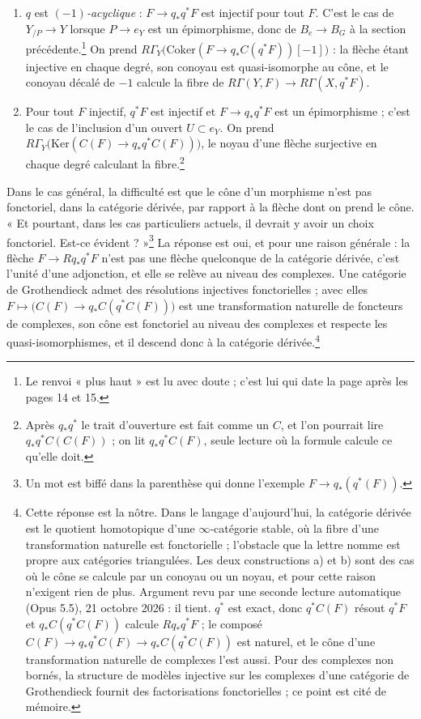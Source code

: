 \documentclass[11pt,a4paper]{article}
\begin{document}
\begin{enumerate}
\item[a)] $q$ est \emph{$(-1)$-acyclique} : $F \to q_* q^* F$ est injectif
pour tout $F$. C'est le cas de $Y_{/P} \to Y$ lorsque $P \to e_Y$ est un
épimorphisme, donc de $B_e \to B_G$ à la section précédente.\footnote{Le
renvoi « plus haut » est lu avec doute ; c'est lui qui date la page après les
pages 14 et 15.} On prend
$R\Gamma_Y\bigl(\mathrm{Coker}(F \to q_* C(q^*F))[-1]\bigr)$ : la flèche
étant injective en chaque degré, son conoyau est quasi-isomorphe au cône, et
le conoyau décalé de $-1$ calcule la fibre de
$R\Gamma(Y, F) \to R\Gamma(X, q^*F)$.
\item[b)] Pour tout $F$ injectif, $q^* F$ est injectif et $F \to q_* q^* F$
est un épimorphisme ; c'est le cas de l'inclusion d'un ouvert
$U \subset e_Y$. On prend
$R\Gamma_Y\bigl(\mathrm{Ker}(C(F) \to q_* q^* C(F))\bigr)$, le noyau d'une
flèche surjective en chaque degré calculant la fibre.\footnote{Après
$q_* q^*$ le trait d'ouverture est fait comme un $C$, et l'on pourrait lire
$q_* q^* C(C(F))$ ; on lit $q_* q^* C(F)$, seule lecture où la formule
calcule ce qu'elle doit.}
\end{enumerate}

Dans le cas général, la difficulté est que le cône d'un morphisme n'est pas
fonctoriel, dans la catégorie dérivée, par rapport à la flèche dont on prend
le cône. « Et pourtant, dans les cas particuliers actuels, il devrait y avoir
un choix fonctoriel. Est-ce évident ? »\footnote{Un mot est biffé dans la
parenthèse qui donne l'exemple $F \to q_*(q^*(F))$.} La réponse est oui, et
pour une raison générale : la flèche $F \to Rq_* q^* F$ n'est pas une flèche
quelconque de la catégorie dérivée, c'est l'unité d'une adjonction, et elle se
relève au niveau des complexes. Une catégorie de Grothendieck admet des
résolutions injectives fonctorielles ; avec elles $F \mapsto
\bigl(C(F) \to q_* C(q^* C(F))\bigr)$ est une transformation naturelle de
foncteurs de complexes, son cône est fonctoriel au niveau des complexes et
respecte les quasi-isomorphismes, et il descend donc à la catégorie
dérivée.\footnote{Cette réponse est la nôtre. Dans le langage d'aujourd'hui,
la catégorie dérivée est le quotient homotopique d'une $\infty$-catégorie
stable, où la fibre d'une transformation naturelle est fonctorielle ;
l'obstacle que la lettre nomme est propre aux catégories triangulées. Les
deux constructions a) et b) sont des cas où le cône se calcule par un
conoyau ou un noyau, et pour cette raison n'exigent rien de plus. Argument revu par une seconde lecture automatique (Opus 5.5), 21 octobre 2026 : il tient. $q^{*}$ est exact, donc $q^{*}C(F)$ résout $q^{*}F$ et $q_{*}C(q^{*}C(F))$ calcule $Rq_{*}q^{*}F$ ; le composé $C(F) \to q_{*}q^{*}C(F) \to q_{*}C(q^{*}C(F))$ est naturel, et le cône d'une transformation naturelle de complexes l'est aussi. Pour des complexes non bornés, la structure de modèles injective sur les complexes d'une catégorie de Grothendieck fournit des factorisations fonctorielles ; ce point est cité de mémoire.}
\end{document}
